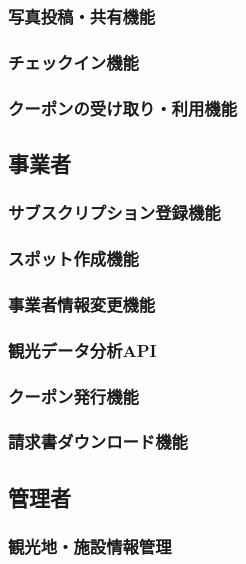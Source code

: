 \documentclass{docs}
\begin{document}
\subsubsection{写真投稿・共有機能}

\subsubsection{チェックイン機能}

\subsubsection{クーポンの受け取り・利用機能}

\subsection{事業者}
\subsubsection{サブスクリプション登録機能}

\subsubsection{スポット作成機能}

\subsubsection{事業者情報変更機能}

\subsubsection{観光データ分析API}

\subsubsection{クーポン発行機能}

\subsubsection{請求書ダウンロード機能}

\subsection{管理者}
\subsubsection{観光地・施設情報管理}
\end{document}
